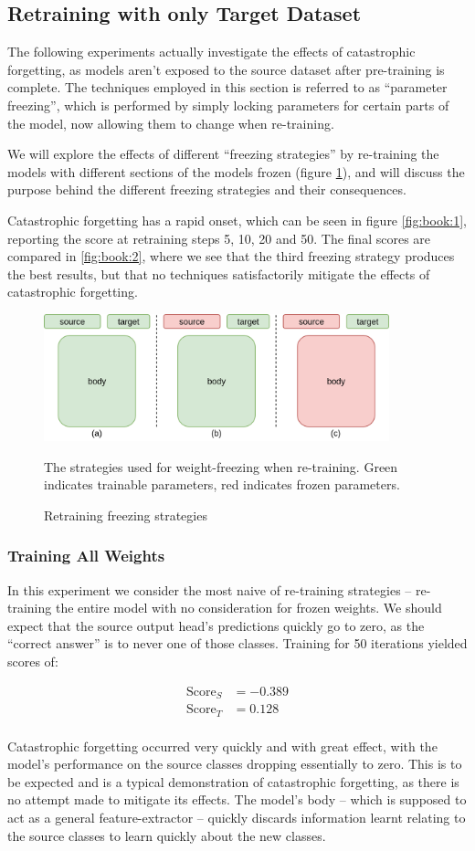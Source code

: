 \documentclass{report}
\newcommand{\SCORE}[2]{
	\begin{align*}
	\text{Score}_S &= #1 \\
	\text{Score}_T &= #2 \\
	\end{align*}
}
\begin{document}
	\subsection{Retraining with only Target Dataset}
	The following experiments actually investigate the effects of catastrophic forgetting, as models aren't exposed to the source dataset after pre-training is complete. The techniques employed in this section is referred to as ``parameter freezing'', which is performed by simply locking parameters for certain parts of the model, now allowing them to change when re-training. \par 
	We will explore the effects of different ``freezing strategies'' by re-training the models with different sections of the models frozen (figure \ref{fig:freezing:1}), and will discuss the purpose behind the different freezing strategies and their consequences. \par
	Catastrophic forgetting has a rapid onset, which can be seen in figure \ref{fig:book:1}, reporting the score at retraining steps 5, 10, 20 and 50. The final scores are compared in \ref{fig:book:2}, where we see that the third freezing strategy produces the best results, but that no techniques satisfactorily mitigate the effects of catastrophic forgetting. \par
	
	\begin{figure}[h]
		\centering
		\includegraphics[width=10cm]{freezing}
		\caption{Retraining freezing strategies}
		The strategies used for weight-freezing when re-training. Green indicates trainable parameters, red indicates frozen parameters.
		\label{fig:freezing:1}
	\end{figure}
	\subsubsection{Training All Weights}
	In this experiment we consider the most naive of re-training strategies -- re-training the entire model with no consideration for frozen weights. We should expect that the source output head's predictions quickly go to zero, as the ``correct answer'' is to never one of those classes. Training for 50 iterations yielded scores of:
	\SCORE{-0.389}{0.128}
	Catastrophic forgetting occurred very quickly and with great effect, with the model's performance on the source classes dropping essentially to zero. This is to be expected and is a typical demonstration of catastrophic forgetting, as there is no attempt made to mitigate its effects. The model's body -- which is supposed to act as a general feature-extractor -- quickly discards information learnt relating to the source classes to learn quickly about the new classes. \par
	
\end{document}
